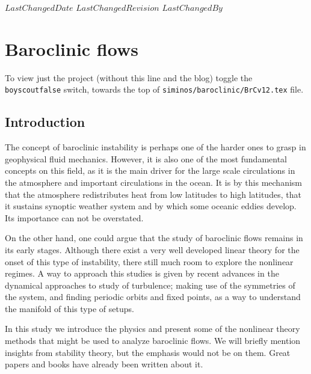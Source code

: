 {$LastChangedDate$}
{$LastChangedRevision$} {$LastChangedBy$}

\chapter{Baroclinic flows}
\label{chap:baroclinic}

    \ifboyscout
To view just the project (without this line and the blog)
toggle the \texttt{boyscoutfalse} switch, towards the top of
\texttt{siminos/baroclinic/BrCv12.tex} file.
    \fi

\section{Introduction}
\label{s:intro}

The concept of baroclinic instability is perhaps one of the harder ones
to grasp in geophysical fluid mechanics. However, it is also one of the
most fundamental concepts on this field, as it is the main driver for the
large scale circulations in the atmosphere and important circulations in
the ocean. It is by this mechanism that the atmosphere redistributes heat
from low latitudes to high latitudes, that it sustains synoptic weather
system and by which some oceanic eddies develop. Its importance can not
be overstated.

On the other hand, one could argue that the study of baroclinic flows
remains in its early stages. Although there exist a very well developed
linear theory for the onset of this type of instability, there still much
room to explore the nonlinear regimes. A way to approach this studies is
given by recent advances in the dynamical approaches to study of
turbulence;
making use of the symmetries of the system, and finding periodic orbits
and fixed points, as a way to understand the manifold of this type of
setups.

In this study we introduce the physics and present some of the nonlinear theory
methods that might be used to analyze baroclinic flows. We will briefly
mention insights from stability theory, but the emphasis would not be on
them. Great papers and books have already been written about it.

